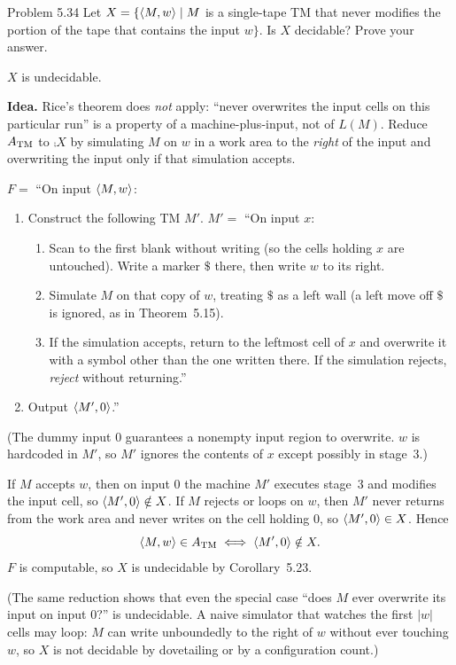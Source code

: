\begin{question}{Problem 5.34}
Let $X=\{\langle M,w\rangle\mid M$ is a single-tape TM that never modifies the portion of the tape that contains the input $w\}$. Is $X$ decidable? Prove your answer.
\end{question}
\begin{soln}
$X$ is undecidable.

\textbf{Idea.} Rice's theorem does \emph{not} apply: ``never overwrites the input cells on this particular run'' is a property of a machine-plus-input, not of $L(M)$. Reduce $A_{\mathrm{TM}}$ to $\comp{X}$ by simulating $M$ on $w$ in a work area to the \emph{right} of the input and overwriting the input only if that simulation accepts.

$F=$ ``On input $\langle M,w\rangle$:
\begin{enumerate}
\item Construct the following TM $M'$.
$M'=$ ``On input $x$:
\begin{enumerate}
\item Scan to the first blank without writing (so the cells holding $x$ are untouched). Write a marker $\$$ there, then write $w$ to its right.
\item Simulate $M$ on that copy of $w$, treating $\$$ as a left wall (a left move off $\$$ is ignored, as in Theorem~5.15).
\item If the simulation accepts, return to the leftmost cell of $x$ and overwrite it with a symbol other than the one written there. If the simulation rejects, \emph{reject} without returning.''
\end{enumerate}
\item Output $\langle M',0\rangle$.''
\end{enumerate}
(The dummy input $0$ guarantees a nonempty input region to overwrite. $w$ is hardcoded in $M'$, so $M'$ ignores the contents of $x$ except possibly in stage~3.)

If $M$ accepts $w$, then on input $0$ the machine $M'$ executes stage~3 and modifies the input cell, so $\langle M',0\rangle\notin X$. If $M$ rejects or loops on $w$, then $M'$ never returns from the work area and never writes on the cell holding $0$, so $\langle M',0\rangle\in X$. Hence
\[
\langle M,w\rangle\in A_{\mathrm{TM}} \iff \langle M',0\rangle\notin X.
\]
$F$ is computable, so $X$ is undecidable by Corollary~5.23.

(The same reduction shows that even the special case ``does $M$ ever overwrite its input on input $0$?'' is undecidable. A naive simulator that watches the first $|w|$ cells may loop: $M$ can write unboundedly to the right of $w$ without ever touching $w$, so $X$ is not decidable by dovetailing or by a configuration count.)
\end{soln}

